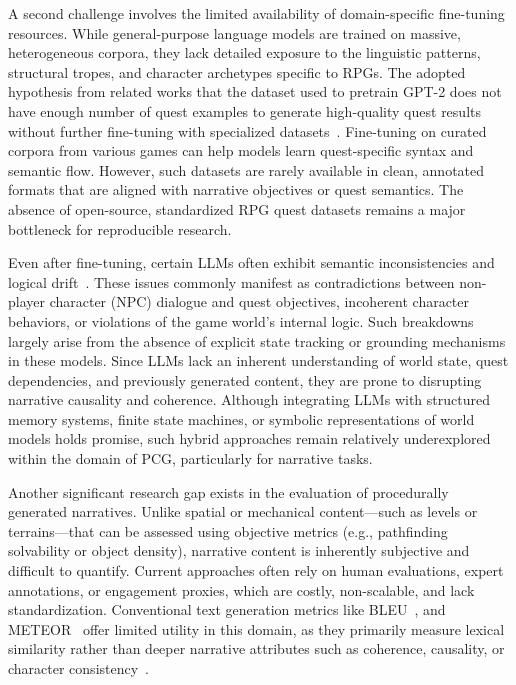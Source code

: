 A second challenge involves the limited availability of domain-specific fine-tuning
resources. While general-purpose language models are trained on massive, heterogeneous
corpora, they lack detailed exposure to the linguistic patterns, structural tropes, and character
archetypes specific to RPGs. The adopted hypothesis from related works that the
dataset used to pretrain GPT-2 does not have enough number of quest examples to generate
high-quality quest results without further fine-tuning with specialized datasets~\cite{vartinen2022generating,van2021fine}.
Fine-tuning on curated corpora from various games can help models learn quest-specific
syntax and semantic flow. However, such datasets are rarely available in clean,
annotated formats that are aligned with narrative objectives or quest semantics. The
absence of open-source, standardized RPG quest datasets remains a major bottleneck for
reproducible research.

Even after fine-tuning, certain LLMs often exhibit semantic inconsistencies and logical
drift~\cite{luo2023empirical,huang2025survey}. These issues commonly manifest as contradictions between non-player
character (NPC) dialogue and quest objectives, incoherent character behaviors, or violations
of the game world's internal logic. Such breakdowns largely arise from the absence
of explicit state tracking or grounding mechanisms in these models. Since LLMs lack an
inherent understanding of world state, quest dependencies, and previously generated content,
they are prone to disrupting narrative causality and coherence. Although integrating
LLMs with structured memory systems, finite state machines, or symbolic representations
of world models holds promise, such hybrid approaches remain relatively underexplored
within the domain of PCG, particularly for narrative tasks.

Another significant research gap exists in the evaluation of procedurally generated
narratives. Unlike spatial or mechanical content—such as levels or terrains—that can be
assessed using objective metrics (e.g., pathfinding solvability or object density), narrative
content is inherently subjective and difficult to quantify. Current approaches often rely
on human evaluations, expert annotations, or engagement proxies, which are costly, non-scalable,
and lack standardization. Conventional text generation metrics like BLEU~\cite{papineni02bleu},
and METEOR~\cite{banarjee2005} offer limited utility in this domain, as they primarily measure lexical
similarity rather than deeper narrative attributes such as coherence, causality, or character
consistency~\cite{celikyilmaz2020evaluation}.

